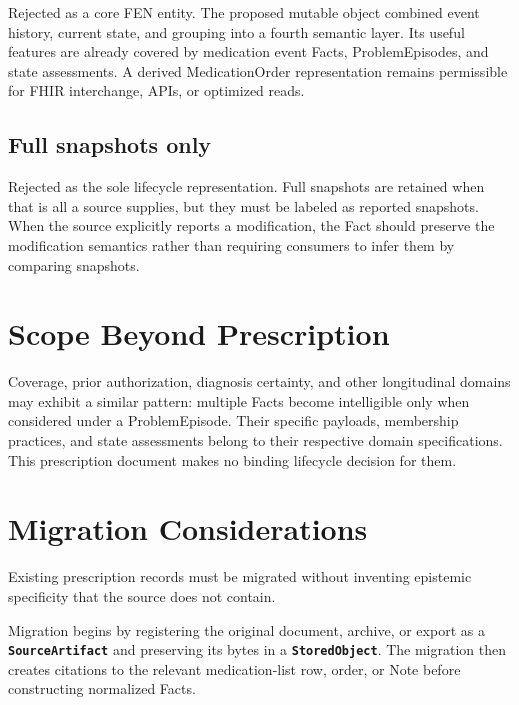 \documentclass[11pt]{article}
\newcommand{\entity}[1]{\texttt{\textbf{#1}}}
\begin{document}
Rejected as a core FEN entity. The proposed mutable object combined event
history, current state, and grouping into a fourth semantic layer. Its useful
features are already covered by medication event Facts, ProblemEpisodes, and
state assessments. A derived MedicationOrder representation remains
permissible for FHIR interchange, APIs, or optimized reads.

\subsection{Full snapshots only}

Rejected as the sole lifecycle representation. Full snapshots are retained
when that is all a source supplies, but they must be labeled as reported
snapshots. When the source explicitly reports a modification, the Fact should
preserve the modification semantics rather than requiring consumers to infer
them by comparing snapshots.

\section{Scope Beyond Prescription}

Coverage, prior authorization, diagnosis certainty, and other longitudinal
domains may exhibit a similar pattern: multiple Facts become intelligible
only when considered under a ProblemEpisode. Their specific payloads,
membership practices, and state assessments belong to their respective
domain specifications. This prescription document makes no binding lifecycle
decision for them.

\section{Migration Considerations}
\label{sec:migration}

Existing prescription records must be migrated without inventing epistemic
specificity that the source does not contain.

Migration begins by registering the original document, archive, or export as a
\entity{SourceArtifact} and preserving its bytes in a \entity{StoredObject}.
The migration then creates citations to the relevant medication-list row,
order, or Note before constructing normalized Facts.
\end{document}
